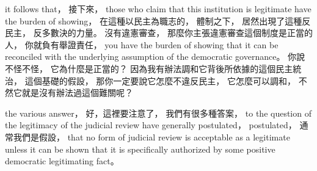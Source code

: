 \hypertarget{w02:cue:496}{}it follows that，
\hypertarget{w02:cue:497}{}接下來，
\hypertarget{w02:cue:498}{}those who claim that this institution is legitimate
\hypertarget{w02:cue:499}{}have the burden of showing，
\hypertarget{w02:cue:500}{}在這種以民主為職志的，
\hypertarget{w02:cue:501}{}體制之下，
\hypertarget{w02:cue:502}{}居然出現了這種反民主，
\hypertarget{w02:cue:503}{}反多數決的力量。
\hypertarget{w02:cue:504}{}沒有違憲審查，
\hypertarget{w02:cue:505}{}那麼你主張違憲審查這個制度是正當的人，
\hypertarget{w02:cue:506}{}你就負有舉證責任，
\hypertarget{w02:cue:507}{}you have the burden of showing
\hypertarget{w02:cue:508}{}that it can be reconciled with the underlying assumption
\hypertarget{w02:cue:509}{}of the democratic governance。
\hypertarget{w02:cue:510}{}你說不怪不怪，
\hypertarget{w02:cue:511}{}它為什麼是正當的？
\hypertarget{w02:cue:512}{}因為我有辦法調和它背後所依據的這個民主統治，
\hypertarget{w02:cue:513}{}這個基礎的假設，
\hypertarget{w02:cue:514}{}那你一定要說它怎麼不違反民主，
\hypertarget{w02:cue:515}{}它怎麼可以調和，
\hypertarget{w02:cue:516}{}不然它就是沒有辦法過這個難關呢？

\hypertarget{w02:cue:517}{}the various answer，
\hypertarget{w02:cue:518}{}好，這裡要注意了，
\hypertarget{w02:cue:519}{}我們有很多種答案，
\hypertarget{w02:cue:520}{}to the question of the legitimacy of the judicial review
\hypertarget{w02:cue:521}{}have generally postulated，
\hypertarget{w02:cue:522}{}postulated，
\hypertarget{w02:cue:523}{}通常我們是假設，
\hypertarget{w02:cue:524}{}that no form of judicial review is acceptable as a legitimate
\hypertarget{w02:cue:525}{}unless it can be shown that it is specifically authorized by some positive democratic legitimating fact。

